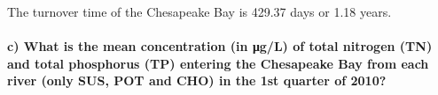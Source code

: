 \documentclass[
]{article}
\let\oldparagraph\paragraph
\renewcommand{\paragraph}[1]{\oldparagraph{#1}\mbox{}}
\begin{document}
The turnover time of the Chesapeake Bay is 429.37 days or 1.18 years.

\hypertarget{c-what-is-the-mean-concentration-in-ux3bcgl-of-total-nitrogen-tn-and-total-phosphorus-tp-entering-the-chesapeake-bay-from-each-river-only-sus-pot-and-cho-in-the-1st-quarter-of-2010}{%
\paragraph{c) What is the mean concentration (in μg/L) of total nitrogen
(TN) and total phosphorus (TP) entering the Chesapeake Bay from each
river (only SUS, POT and CHO) in the 1st quarter of
2010?}\label{c-what-is-the-mean-concentration-in-ux3bcgl-of-total-nitrogen-tn-and-total-phosphorus-tp-entering-the-chesapeake-bay-from-each-river-only-sus-pot-and-cho-in-the-1st-quarter-of-2010}}
\end{document}
